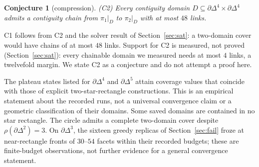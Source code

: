 \documentclass[12pt]{article}
\newtheorem{conjecture}[theo]{Conjecture}
\begin{document}
\begin{conjecture}[compression]\label{conj:compress}
\emph{(C2)} Every contiguity domain $D\subseteq\partial\Delta^4\times
\partial\Delta^4$ admits a contiguity chain from $\pi_1|_D$ to
$\pi_2|_D$ with at most $48$ links.
\end{conjecture}

\noindent C1 follows from C2 and the solver result of
Section~\ref{sec:sat}: a two-domain cover would have chains of at most
$48$ links.  Support for C2 is measured, not proved
(Section~\ref{sec:sat}): every chainable domain we measured needs at
most $4$ links, a twelvefold margin.  We state C2 as a conjecture and
do not attempt a proof here.

The plateau states listed for $\partial\Delta^4$ and
$\partial\Delta^5$ attain coverage values that coincide with those of
explicit two-star-rectangle constructions. This is an empirical statement
about the recorded runs, not a universal convergence claim or a geometric
classification of their domains. Some saved domains are contained in no
star rectangle. The circle admits a complete two-domain cover despite
$\rho(\partial\Delta^2)=3$.  On $\partial\Delta^3$, the sixteen greedy
replicas of Section~\ref{sec:fail} froze at near-rectangle fronts of
$30$--$54$ facets within their recorded budgets; these are
finite-budget observations, not further evidence for a general
convergence statement.
\end{document}
